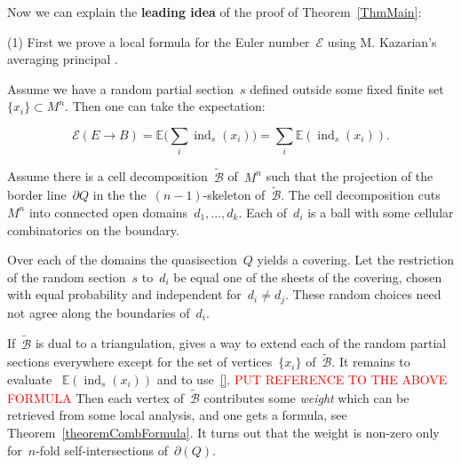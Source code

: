 \documentclass[12pt]{amsart}
\theoremstyle{plain}
\theoremstyle{definition}
\theoremstyle{plain}
\theoremstyle{definition}
\DeclareMathOperator{\ind}{ind}
\begin{document}
	
	
	
	

	\iffalse
	

	Now we can explain the \textbf{leading idea} of the proof of Theorem~\ref{ThmMain}:
	
(1)  First we prove a local formula for the Euler number~$\mathcal{E}$  using  M. Kazarian's averaging principal \cite{Kazar}.

	Assume we have a random partial section~$s$  defined outside some fixed finite set~$\{x_i\}\subset M^n$. 
	Then one can take the expectation:
	
	
	$$\mathcal{E}(E\rightarrow B)=\mathbb{E}\Big(\sum_i \ind_s(x_i)\Big)= \sum_i \mathbb{E}(\ind_s(x_i)).$$

    

Assume there is a cell decomposition~$\widetilde{\mathcal{B}}$ of~$M^n$ such that  the projection of the border line~$\partial Q$  in the  the~$(n-1)$-skeleton of~$\widetilde{\mathcal{B}}$. The cell decomposition cuts~$M^n$ into connected open domains~$d_1,...,d_k$.  Each of~$d_i$ is a ball with some  cellular  combinatorics on the boundary. 

   Over each of the domains the quasisection~$Q$ yields  a   covering. 
  Let the restriction of the random section~$s$ to~$d_i$ be equal one of the  sheets of the covering, chosen with equal probability and independent for~$d_i\neq d_j$.  
  These random choices need not agree along the boundaries of~$d_i$.  
  
   If~$\widetilde{\mathcal{B}}$ is dual to a triangulation, \cite{Sullivan} gives a way to extend each of the random partial sections everywhere except for the set of vertices~$\{x_i\}$ of~$\widetilde{\mathcal{B}}$.
   It remains to evaluate
~$\mathbb{E}(\ind_s(x_i))$  and to use~\ref{}. \textcolor{red}{PUT REFERENCE TO THE ABOVE FORMULA}
  Then each vertex of~$\widetilde{\mathcal{B}}$ contributes some \textit{ weight} which can be retrieved from some local analysis, and one gets a formula, see Theorem~\ref{theoremCombFormula}.  It turns out that the weight is non-zero only for~$n$-fold self-intersections of~$\partial(Q)$.
  
\end{document}

